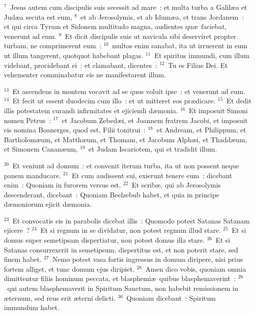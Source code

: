 ${}^{7}$~Jesus autem cum discipulis suis secessit ad mare~: et multa turba a Galil\ae a et Jud\ae a secuta est eum,
${}^{8}$~et ab Jerosolymis, et ab Idum\ae a, et trans Jordanem~: et qui circa Tyrum et Sidonem multitudo magna, audientes qu\ae\ faciebat, venerunt ad eum.
${}^{9}$~Et dicit discipulis suis ut navicula sibi deserviret propter turbam, ne comprimerent eum~:
${}^{10}$~multos enim sanabat, ita ut irruerent in eum ut illum tangerent, quotquot habebant plagas.
${}^{11}$~Et spiritus immundi, cum illum videbant, procidebant ei~: et clamabant, dicentes~:
${}^{12}$~Tu es Filius Dei. Et vehementer comminabatur eis ne manifestarent illum.


${}^{13}$~Et ascendens in montem vocavit ad se quos voluit ipse~: et venerunt ad eum.
${}^{14}$~Et fecit ut essent duodecim cum illo~: et ut mitteret eos pr\ae dicare.
${}^{15}$~Et dedit illis potestatem curandi infirmitates et ejiciendi d\ae monia.
${}^{16}$~Et imposuit Simoni nomen Petrus~:
${}^{17}$~et Jacobum Zebed\ae i, et Joannem fratrem Jacobi, et imposuit eis nomina Boanerges, quod est, Filii tonitrui~:
${}^{18}$~et Andream, et Philippum, et Bartholom\ae um, et Matth\ae um, et Thomam, et Jacobum Alph\ae i, et Thadd\ae um, et Simonem Canan\ae um,
${}^{19}$~et Judam Iscariotem, qui et tradidit illum.


${}^{20}$~Et veniunt ad domum~: et convenit iterum turba, ita ut non possent neque panem manducare.
${}^{21}$~Et cum audissent sui, exierunt tenere eum~: dicebant enim~: Quoniam in furorem versus est.
${}^{22}$~Et scrib\ae , qui ab Jerosolymis descenderant, dicebant~: Quoniam Beelzebub habet, et quia in principe d\ae moniorum ejicit d\ae monia.


${}^{23}$~Et convocatis eis in parabolis dicebat illis~: Quomodo potest Satanas Satanam ejicere~?
${}^{24}$~Et si regnum in se dividatur, non potest regnum illud stare.
${}^{25}$~Et si domus super semetipsam dispertiatur, non potest domus illa stare.
${}^{26}$~Et si Satanas consurrexerit in semetipsum, dispertitus est, et non poterit stare, sed finem habet.
${}^{27}$~Nemo potest vasa fortis ingressus in domum diripere, nisi prius fortem alliget, et tunc domum ejus diripiet.
${}^{28}$~Amen dico vobis, quoniam omnia dimittentur filiis hominum peccata, et blasphemi\ae\ quibus blasphemaverint~:
${}^{29}$~qui autem blasphemaverit in Spiritum Sanctum, non habebit remissionem in \ae ternum, sed reus erit \ae terni delicti.
${}^{30}$~Quoniam dicebant~: Spiritum immundum habet.



